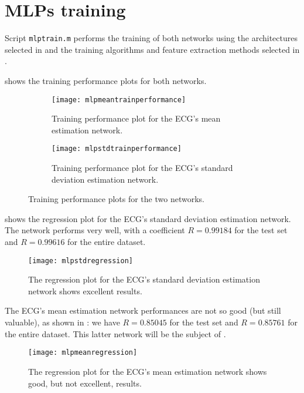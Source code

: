 \section{MLPs training}\label{sec:mlptraining}

Script \texttt{mlptrain.m} performs the training of both networks using the
architectures selected in  and the training
algorithms and feature extraction methods selected in
.

 shows the training performance plots for both
networks. 

\begin{figure}[htbp]
	\centering
	\begin{subfigure}{\textwidth}
		\centering
		\texttt{[image: mlpmeantrainperformance]}
		\caption{Training performance plot for the ECG's mean
		estimation network.}\label{fig:mlpmeantrainperformance}
	\end{subfigure}
	\begin{subfigure}{\textwidth}
		\centering
		\texttt{[image: mlpstdtrainperformance]}
		\caption{Training performance plot for the ECG's standard
		deviation estimation network.}\label{fig:mlpstdtrainperformance}
	\end{subfigure}
	\caption{Training performance plots for the two
	networks.}\label{fig:mlptrainperformance}
\end{figure}

 shows the regression plot for the ECG's standard
deviation estimation network. The network performs very well, with a
coefficient \(R = 0.99184\) for the test set and \(R = 0.99616\) for the entire
dataset.

\begin{figure}[htbp]
	\centering
	\texttt{[image: mlpstdregression]}
	\caption{The regression plot for the ECG's standard deviation
	estimation network shows excellent
	results.}\label{fig:mlpstdregression}
\end{figure}

The ECG's mean estimation network performances are not so good (but still
valuable), as shown in : we have \(R = 0.85045\)
for the test set and \(R = 0.85761\) for the entire dataset. This latter
network will be the subject of .

\begin{figure}[htbp]
	\centering
	\texttt{[image: mlpmeanregression]}
	\caption{The regression plot for the ECG's mean estimation network
	shows good, but not excellent, results.}\label{fig:mlpmeanregression}
\end{figure}

